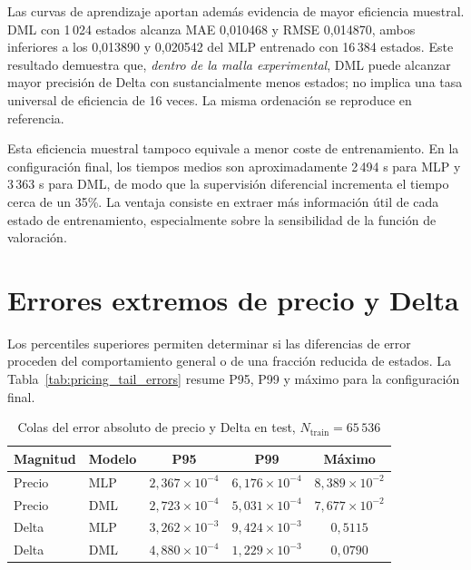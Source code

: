 Las curvas de aprendizaje aportan además evidencia de mayor eficiencia muestral. DML con
1\,024 estados alcanza MAE 0{,}010468 y RMSE 0{,}014870, ambos inferiores a los
0{,}013890 y 0{,}020542 del MLP entrenado con 16\,384 estados. Este resultado demuestra
que, \emph{dentro de la malla experimental}, DML puede alcanzar mayor precisión de Delta
con sustancialmente menos estados; no implica una tasa universal de eficiencia de 16 veces.
La misma ordenación se reproduce en referencia.

Esta eficiencia muestral tampoco equivale a menor coste de entrenamiento. En la
configuración final, los tiempos medios son aproximadamente 2\,494 s para MLP y
3\,363 s para DML, de modo que la supervisión diferencial incrementa el tiempo cerca de
un 35\%. La ventaja consiste en extraer más información útil de cada estado de
entrenamiento, especialmente sobre la sensibilidad de la función de valoración.

\section{Errores extremos de precio y Delta}
\label{sec:extreme_errors}

Los percentiles superiores permiten determinar si las diferencias de error proceden del
comportamiento general o de una fracción reducida de estados. La
Tabla~\ref{tab:pricing_tail_errors} resume P95, P99 y máximo para la configuración final.

\begin{table}[htbp]
\centering
\small
\caption{Colas del error absoluto de precio y Delta en test,
$N_{\mathrm{train}}=65\,536$}
\label{tab:pricing_tail_errors}
\label{tab:delta_tail_errors}
\begin{tabular}{llccc}
\toprule
\textbf{Magnitud} & \textbf{Modelo} & \textbf{P95} & \textbf{P99} & \textbf{Máximo} \\
\midrule
Precio & MLP & $2{,}367\times10^{-4}$ & $6{,}176\times10^{-4}$ & $8{,}389\times10^{-2}$ \\
Precio & DML & $2{,}723\times10^{-4}$ & $5{,}031\times10^{-4}$ & $7{,}677\times10^{-2}$ \\
Delta & MLP & $3{,}262\times10^{-3}$ & $9{,}424\times10^{-3}$ & $0{,}5115$ \\
Delta & DML & $4{,}880\times10^{-4}$ & $1{,}229\times10^{-3}$ & $0{,}0790$ \\
\bottomrule
\end{tabular}
\par{}
\end{table}

